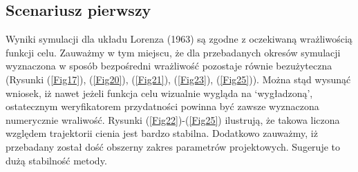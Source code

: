 \documentclass[12pt]{article}
\begin{document}
\subsection{Scenariusz pierwszy}
Wyniki symulacji dla układu Lorenza (1963) są zgodne z oczekiwaną wrażliwością funkcji celu. Zauważmy w tym miejscu, że dla przebadanych okresów symulacji wyznaczona w sposób bezpośredni wrażliwość pozostaje równie bezużyteczna (Rysunki (\ref{Fig17}), (\ref{Fig20}), (\ref{Fig21}), (\ref{Fig23}), (\ref{Fig25})). Można stąd wysunąć wniosek, iż nawet jeżeli funkcja celu wizualnie wygląda na ‘wygładzoną’, ostatecznym weryfikatorem przydatności powinna być zawsze wyznaczona numerycznie wraliwość. \newline
Rysunki (\ref{Fig22})-(\ref{Fig25}) ilustrują, że takowa liczona względem trajektorii cienia jest bardzo stabilna. Dodatkowo zauważmy, iż przebadany został dość obszerny zakres parametrów projektowych. Sugeruje to dużą stabilność metody. 
\end{document}
